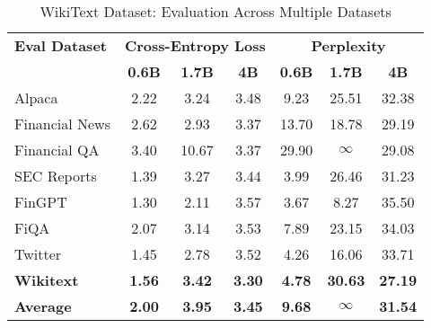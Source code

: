 
\begin{table}[h]
\centering
\caption[WikiText: Evaluation Results]{WikiText Dataset: Evaluation Across Multiple Datasets}
\label{tab:wikitext_results}
\begin{tabular}{l|ccc|ccc}
\hline
\textbf{Eval Dataset} & \multicolumn{3}{c|}{\textbf{Cross-Entropy Loss}} & \multicolumn{3}{c}{\textbf{Perplexity}} \\
\cline{2-4} \cline{5-7}
  & \textbf{0.6B} & \textbf{1.7B} & \textbf{4B} & \textbf{0.6B} & \textbf{1.7B} & \textbf{4B} \\
Alpaca & 2.22 & 3.24 & 3.48 & 9.23 & 25.51 & 32.38 \\
Financial News & 2.62 & 2.93 & 3.37 & 13.70 & 18.78 & 29.19 \\
Financial QA & 3.40 & 10.67 & 3.37 & 29.90 & $\infty$ & 29.08 \\
SEC Reports & 1.39 & 3.27 & 3.44 & 3.99 & 26.46 & 31.23 \\
FinGPT & 1.30 & 2.11 & 3.57 & 3.67 & 8.27 & 35.50 \\
FiQA & 2.07 & 3.14 & 3.53 & 7.89 & 23.15 & 34.03 \\
Twitter & 1.45 & 2.78 & 3.52 & 4.26 & 16.06 & 33.71 \\
\textbf{Wikitext} & \textbf{1.56} & \textbf{3.42} & \textbf{3.30} & \textbf{4.78} & \textbf{30.63} & \textbf{27.19} \\
\hline
\textbf{Average} & \textbf{2.00} & \textbf{3.95} & \textbf{3.45} & \textbf{9.68} & \textbf{$\infty$} & \textbf{31.54} \\
\hline
\end{tabular}
\end{table}
